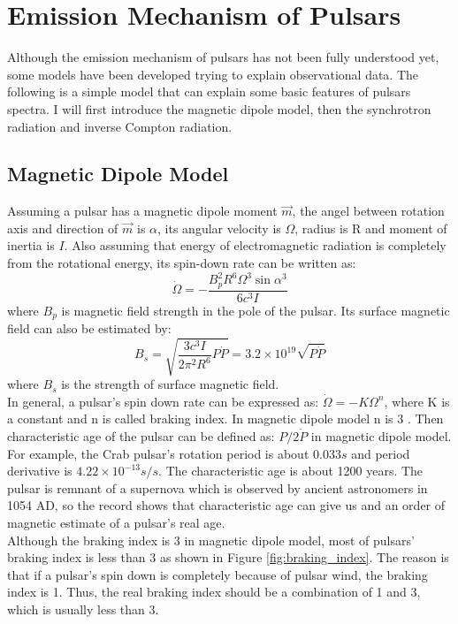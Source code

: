 \documentclass[12pt]{report}
\begin{document}
     \section{Emission Mechanism of Pulsars}
            Although the emission mechanism of pulsars has not been fully understood yet, some models 
            have been developed 
            trying to explain observational data. The following is a simple model that can explain some basic 
            features of pulsars spectra. I will first introduce the magnetic dipole model, then the
            synchrotron radiation and inverse Compton radiation. 
       
        \subsection{Magnetic Dipole Model}
            Assuming a pulsar has a magnetic dipole moment $\vec{m}$, the angel between rotation axis and 
            direction of 
            $\vec{m}$ is $\alpha$, its angular velocity is $\Omega$, radius is R and moment of inertia is $I$. 
            Also assuming that energy of electromagnetic radiation is completely from the rotational energy, 
            its spin-down rate can be written as: 
            $$
                \dot{\Omega}=-\frac{B_p^2 R^6 \Omega^3 \sin{\alpha}^3}{6c^3I}
            $$
            where $B_p$ is magnetic field strength in the pole of the pulsar. Its surface magnetic field can 
            also be estimated
            by:
            $$
                B_s=\sqrt{\frac{3c^3I}{2\pi^2R^6}P\dot{P}}=3.2\times 10^{19}\sqrt{P\dot{P}}
            $$
            where $B_s$ is the strength of surface magnetic field. \\
            \indent In general, a pulsar's spin down rate can be expressed as: $\dot{\Omega}=-K\Omega^{n}$, 
            where K is a 
            constant and n is called braking index. In magnetic dipole model n is 3 \cite{Tong2015}. Then 
            characteristic age of the pulsar can be defined as: $P/2\dot{P}$ in magnetic dipole model. 
            For example, the Crab 
            pulsar's rotation period is about $0.033s$ and period derivative is $4.22\times 10^{-13}s/s$. 
            The characteristic 
            age is about 1200 years. The pulsar is remnant of a supernova which is observed by ancient 
            astronomers in 1054 
            AD, so the record shows that characteristic age can give us and an order of magnetic estimate of a 
            pulsar's real age. \\
            \indent 
            Although the braking index is 3 in magnetic dipole model, most of pulsars' braking index is less than 3 as 
            shown in Figure \ref{fig:braking_index}. The reason is that if a pulsar's spin down is completely because
            of pulsar wind, the braking index is 1. Thus, the real braking index should be a combination of 1 and 3,
            which is usually less than 3. \cite{PhysRevD.91.063007}
\end{document}
